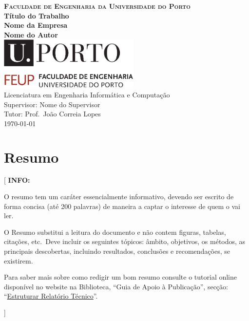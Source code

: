 \documentclass[11pt,a4paper]{report}
\newcommand{\school}{Faculdade de Engenharia da Universidade do Porto}
\newcommand{\degree}{Licenciatura em Engenharia Informática e Computação}
\newcommand{\projtitle}{Título do Trabalho}
\newcommand{\company}{Nome da Empresa}
\newcommand{\projauthor}{Nome do Autor}
\newcommand{\supervisor}{Nome do Supervisor}
\newcommand{\tutor}{Prof.\ João Correia Lopes}
\newenvironment{info}[1]{\vspace*{6mm}\color{blue}[ \textbf{INFO:} \begin{em} #1}
                        {\vspace*{3mm}\end{em} ]}
\begin{document}
\setcounter{page}{1}


\begin{titlepage}
\center

\vspace{-15mm}
{\Large \textbf{\textsc{\school}}}\\[28mm]
{\huge \textbf{\projtitle}}\\[8mm]
{\huge \textbf{\company}}\\[30mm]
{\Large \textbf{\projauthor}}\\[56mm]
\includegraphics[width=70mm]{uporto-feup.pdf}\\[30mm]
{\large \degree}\\[12mm]
{\large Supervisor: \supervisor}\\[4mm]
{\large Tutor: \tutor}\\[12mm]

\today

\end{titlepage}


\chapter*{Resumo}

\begin{info}
O resumo tem um caráter essencialmente informativo, devendo ser
escrito de forma concisa (até 200 palavras) de maneira a captar o
interesse de quem o vai ler.

O Resumo substitui a leitura do documento e não contem figuras,
tabelas, citações, etc.\ 
Deve incluir os seguintes tópicos: âmbito, objetivos, os métodos, as
principais descobertas, incluindo resultados, conclusões e
recomendações, se existirem.

Para saber mais sobre como redigir um bom resumo consulte o tutorial
online disponível no website na Biblioteca, ``Guia de Apoio à
Publicação'', secção: 
``\href{https://docs.google.com/document/d/1TDC1behVq8x7fQL4CcPEEh_np5GXviJevQxnQ9gbiJs/edit\#heading=h.s4z9k57ywd9w}
{Estruturar Relatório Técnico}''.
\end{info}
\end{document}

